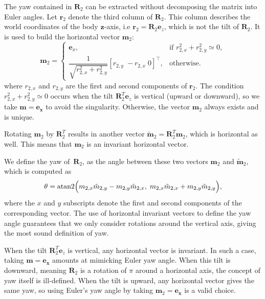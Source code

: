\documentclass[10pt,twocolumn]{ICCAS}
\begin{document}
The yaw contained in $\boldsymbol{R}_{2}$ can be extracted without decomposing the
matrix into Euler angles.  Let $\boldsymbol{r}_{2}$ denote the third column of $\boldsymbol{R}_{2}$.
This column describes the world coordinates of the body $\boldsymbol{z}$-axis, i.e $\boldsymbol{r}_{2}=\boldsymbol{R}_{2}\boldsymbol{e}_z$, which is not the tilt of $\boldsymbol{R}_{2}$. 
It is used to build the horizontal vector $\boldsymbol{m}_2$:
\begin{equation}
  \scriptstyle{
  \boldsymbol{m}_2
  =
  \begin{cases}
    \boldsymbol{e}_x, &
    \text{if } {r}_{2,x}^{2}+{r}_{2,y}^{2}\simeq0,\\[6pt]
      \dfrac{1}{\sqrt{{r}_{2,x}^{2}+{r}_{2,y}^{2}}} [{r}_{2,y}\;-{r}_{2,x}\;0]^{\top},
    & \text{otherwise.}
  \end{cases}
  }
\end{equation}
where ${r}_{2,x}$ and ${r}_{2,y}$ are the first and second components of $\boldsymbol{r}_{2}$. 
The condition ${r}_{2,x}^{2}+{r}_{2,y}^{2}\simeq0$ occurs when the tilt $\boldsymbol{R}_{2}^T \boldsymbol{e}_z$ is vertical (upward or downward), so we take $\boldsymbol{m}=\boldsymbol{e_x}$ to avoid the singularity.
Otherwise, the vector $\boldsymbol{m}_2$ always exists and is unique.

Rotating $\boldsymbol{m}_2$ by $\boldsymbol{R}_{2}^T$
results in another vector
$\tilde{\boldsymbol{m}}_2=\boldsymbol{R}_{2}^T\boldsymbol{m}_2$, which is horizontal as well.
This means that  $\boldsymbol{m}_2$ is an invariant horizontal vector. 

We define the yaw of~$\boldsymbol{R}_{2}$, as the angle between these two vectors $\boldsymbol{m}_2$ and $\tilde{\boldsymbol{m}}_2$, which is computed as
\begin{equation}
  \theta
  =
  \operatorname{atan2}\Bigl(
     {m}_{2,x}\tilde{{m}}_{2,y}
    -{m}_{2,y}\tilde{{m}}_{2,x},\;
     {m}_{2,x}\tilde{{m}}_{2,x}
    +{m}_{2,y}\tilde{{m}}_{2,y}
  \Bigr),
  \label{eq:yaw_theta}
\end{equation}
where the $x$ and $y$ subscripts denote the first and second components of the corresponding vector. 
The use of horizontal invariant vectors to define the yaw angle guarantees that we only consider rotations around the vertical axis, giving the most sound definition of yaw.

When the tilt $\boldsymbol{R}_{2}^T \boldsymbol{e}_z$ is vertical, any horizontal vector is invariant. In such a case, taking $\boldsymbol{m}=\boldsymbol{e_x}$ amounts at mimicking Euler yaw angle. 
When this tilt is downward, meaning $\boldsymbol{R}_{2}$ is a rotation of $\pi$ around a horizontal axis, the concept of yaw itself is ill-defined. When the tilt is upward, any horizontal vector gives the same yaw, so using Euler's yaw angle by taking  $\boldsymbol{m}_2=\boldsymbol{e_x}$ is a valid choice.
\end{document}
